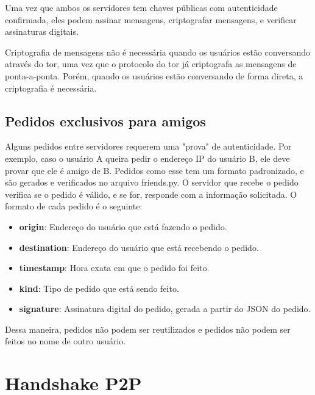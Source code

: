 Uma vez que ambos os servidores tem chaves públicas com autenticidade confirmada, eles podem assinar mensagens, criptografar mensagens, e verificar assinaturas digitais.

Criptografia de mensagens não é necessária quando os usuários estão conversando através do tor, uma vez que o protocolo do tor já criptografa as mensagens de ponta-a-ponta. Porém, quando os usuários estão conversando de forma direta, a criptografia é necessária.

\subsection{Pedidos exclusivos para amigos}

Alguns pedidos entre servidores requerem uma "prova" de autenticidade. Por exemplo, caso o usuário A queira pedir o endereço IP do usuário B, ele deve provar que ele é amigo de B. Pedidos como esse tem um formato padronizado, e são gerados e verificados no arquivo friends.py. O servidor que recebe o pedido verifica se o pedido é válido, e se for, responde com a informação solicitada. O formato de cada pedido é o seguinte:

\begin{itemize}
    \item \textbf{origin}: Endereço do usuário que está fazendo o pedido.
    \item \textbf{destination}: Endereço do usuário que está recebendo o pedido.
    \item \textbf{timestamp}: Hora exata em que o pedido foi feito.
    \item \textbf{kind}: Tipo de pedido que está sendo feito.
    \item \textbf{signature}: Assinatura digital do pedido, gerada a partir do JSON do pedido.
\end{itemize}

Dessa maneira, pedidos não podem ser reutilizados e pedidos não podem ser feitos no nome de outro usuário.

\section{Handshake P2P}

